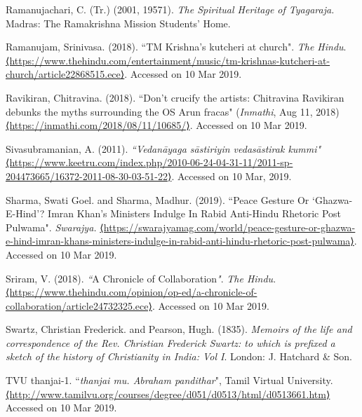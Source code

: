 \begin{thebibliography}{99}
  Ramanujachari, C. (Tr.) (2001, 19571). \textit{The Spiritual Heritage of Tyagaraja. }Madras: The Ramakrishna Mission Students' Home.

  Ramanujam, Srinivasa. (2018). ``TM Krishna's kutcheri at church". \textit{The Hindu}. \url{⟨https://www.thehindu.com/entertainment/music/tm-krishnas-kutcheri-at-church/article22868515.ece⟩}. Accessed on 10 Mar 2019.

  Ravikiran, Chitravina. (2018). ``Don't crucify the artists: Chitravina Ravikiran debunks the myths surrounding the OS Arun fracas" (\textit{Inmathi}, Aug 11, 2018) \url{⟨https://inmathi.com/2018/08/11/10685/⟩}. Accessed on 10 Mar 2019.

  Sivasubramanian, A. (2011). \textit{``Vedanāyaga sāstiriyin vedasāstirak kummi"} \url{⟨https://www.keetru.com/index.php/2010-06-24-04-31-11/2011-sp-204473665/16372-2011-08-30-03-51-22⟩}. Accessed on 10 Mar, 2019.

  Sharma, Swati Goel. and Sharma, Madhur. (2019). ``Peace Gesture Or `Ghazwa-E-Hind'? Imran Khan's Ministers Indulge In Rabid Anti-Hindu Rhetoric Post Pulwama". \textit{Swarajya.} \url{⟨https://swarajyamag.com/world/peace-gesture-or-ghazwa-e-hind-imran-khans-ministers-indulge-in-rabid-anti-hindu-rhetoric-post-pulwama⟩}. Accessed on 10 Mar 2019.

  Sriram, V. (2018). \textit{``}A Chronicle of Collaboration\textit{"}. \textit{The Hindu}. \url{⟨https://www.thehindu.com/opinion/op-ed/a-chronicle-of-collaboration/article24732325.ece⟩}. Accessed on 10 Mar 2019.

  Swartz, Christian Frederick. and Pearson, Hugh. (1835). \textit{Memoirs of the life and correspondence of the Rev. Christian Frederick Swartz: to which is prefixed a sketch of the history of Christianity in India: Vol I}. London: J. Hatchard \& Son.

  TVU thanjai-1. ``\textit{thanjai mu. Abraham pandithar}", Tamil Virtual University. \url{⟨http://www.tamilvu.org/courses/degree/d051/d0513/html/d0513661.htm⟩} Accessed on 10 Mar 2019.

 \end{thebibliography}

\theendnotes




